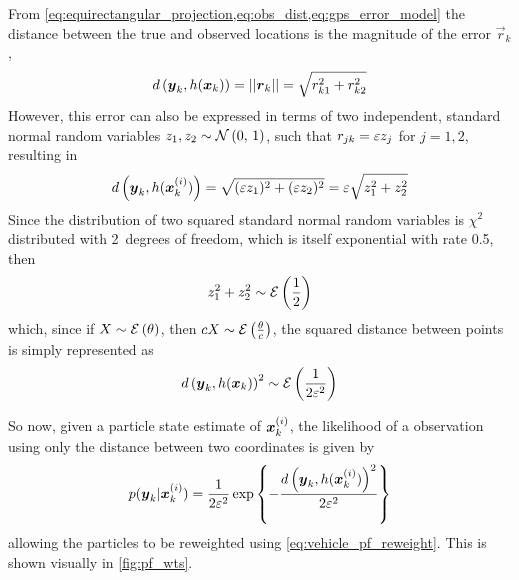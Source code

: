 From \cref{eq:equirectangular_projection,eq:obs_dist,eq:gps_error_model}
the distance between the true and observed locations
is the magnitude of the error $\vec{r}_k$,
\begin{equation}
d\left(\boldsymbol{y}_k, h(\boldsymbol x_k)\right) = ||\boldsymbol{r}_k|| =
    \sqrt{r_{k1}^2 + r_{k2}^2}
\end{equation}
However, this error can also be expressed in terms of two independent,
standard normal random variables $z_1, z_2 \sim \mathcal{N}\left(0,\, 1\right)$,
such that $r_{jk} = \varepsilon z_j$ for $j = 1, 2$,
resulting in
\begin{equation}
d\left(\boldsymbol{y}_k, h(\boldsymbol x^{(i)}_k)\right) =
    \sqrt{(\varepsilon z_1)^2 + (\varepsilon z_2)^2} =
    \varepsilon \sqrt{z_1^2 + z_2^2}
\end{equation}
Since the distribution of two squared standard normal random variables is $\chi^2$ distributed with 2~degrees of freedom,
which is itself exponential with rate 0.5,
then
\begin{equation}
\label{eq:sum_sq_dist}
z_1^2 + z_2^2 \sim \mathcal{E}\left(\frac{1}{2}\right)
\end{equation}
which, since if $X \sim \mathcal{E}\left(\theta\right)$,
then $cX \sim \mathcal{E}\left(\frac{\theta}{c}\right)$,
the squared distance between points is simply represented as
\begin{equation}
\label{eq:distance_distrib}
d\left(\boldsymbol{y}_k, h(\boldsymbol x_k)\right)^2 \sim \mathcal{E}\left(\frac{1}{2\varepsilon^2}\right)
\end{equation}

So now, given a particle state estimate of $\boldsymbol x^{(i)}_k$,
the likelihood of a \GPS{} observation using only
the distance between two coordinates is given by
\begin{equation}
\label{eq:particle_lh_fun}
p(\boldsymbol{y}_k | \boldsymbol x^{(i)}_k) =
    \frac{1}{2\varepsilon^2} \exp\left\{
        - \frac{d\left(\boldsymbol{y}_k, h(\boldsymbol x^{(i)}_k)\right)^2}{2\varepsilon^2}
    \right\}
\end{equation}
allowing the particles to be reweighted using \cref{eq:vehicle_pf_reweight}.
This is shown visually in \cref{fig:pf_wts}.


